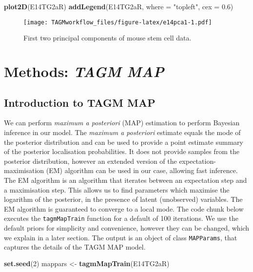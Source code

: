 \documentclass[]{article}
\newenvironment{Shaded}{\begin{snugshade}}{\end{snugshade}}
\newcommand{\KeywordTok}[1]{\textcolor[rgb]{0.13,0.29,0.53}{\textbf{{#1}}}}
\newcommand{\DataTypeTok}[1]{\textcolor[rgb]{0.13,0.29,0.53}{{#1}}}
\newcommand{\DecValTok}[1]{\textcolor[rgb]{0.00,0.00,0.81}{{#1}}}
\newcommand{\FloatTok}[1]{\textcolor[rgb]{0.00,0.00,0.81}{{#1}}}
\newcommand{\StringTok}[1]{\textcolor[rgb]{0.31,0.60,0.02}{{#1}}}
\newcommand{\NormalTok}[1]{{#1}}
\begin{document}
\begin{Shaded}
\begin{Highlighting}[]
\KeywordTok{plot2D}\NormalTok{(E14TG2aR)}
\KeywordTok{addLegend}\NormalTok{(E14TG2aR, }\DataTypeTok{where =} \StringTok{"topleft"}\NormalTok{, }\DataTypeTok{cex =} \FloatTok{0.6}\NormalTok{)}
\end{Highlighting}
\end{Shaded}

\begin{figure}[htbp]
\centering
\texttt{[image: TAGMworkflow\_files/figure-latex/e14pca1-1.pdf]}
\caption{\label{fig:e14pca1}First two principal components of mouse stem
cell data.}
\end{figure}

\newpage

\section{\texorpdfstring{Methods: \emph{TAGM
MAP}}{Methods: TAGM MAP}}\label{methods-tagm-map}

\subsection{Introduction to TAGM MAP}\label{introduction-to-tagm-map}

We can perform \emph{maximum a posteriori} (MAP) estimation to perform
Bayesian inference in our model. The \emph{maximum a posteriori}
estimate equals the mode of the posterior distribution and can be used
to provide a point estimate summary of the posterior localisation
probabilities. It does not provide samples from the posterior
distribution, however an extended version of the
expectation-maximisation (EM) algorithm can be used in our case,
allowing fast inference. The EM algorithm is an algorithm that iterates
between an expectation step and a maximisation step. This allows us to
find parameters which maximise the logarithm of the posterior, in the
presence of latent (unobserved) variables. The EM algorithm is
guaranteed to converge to a local mode. The code chunk below executes
the \texttt{tagmMapTrain} function for a default of 100 iterations. We
use the default priors for simplicity and convenience, however they can
be changed, which we explain in a later section. The output is an object
of class \texttt{MAPParams}, that captures the details of the TAGM MAP
model.

\begin{Shaded}
\begin{Highlighting}[]
\KeywordTok{set.seed}\NormalTok{(}\DecValTok{2}\NormalTok{)}
\NormalTok{mappars <-}\StringTok{ }\KeywordTok{tagmMapTrain}\NormalTok{(E14TG2aR)}
\end{Highlighting}
\end{Shaded}
\end{document}
